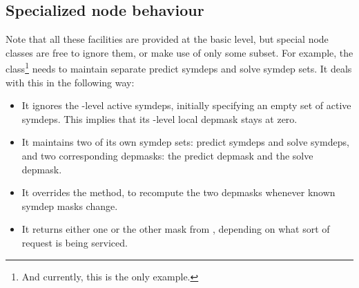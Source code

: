 \subsection{Specialized node behaviour}  
  
  Note that all these facilities are provided at the basic  level, but
  special node classes are free to ignore them, or make use of only some
  subset. For example, the  class\footnote{And currently, this is the
  only example.} needs to maintain separate predict symdeps and solve symdep
  sets. It deals with this in the following way:

  \begin{itemize}
  
  \item It ignores the -level active symdeps, initially specifying an
    empty set of active symdeps. This implies that its -level local
    depmask stays at zero.

  \item It maintains two of its own symdep sets: predict symdeps and solve
    symdeps, and two corresponding depmasks: the predict depmask and the solve
    depmask.
    
  \item It overrides the  method, to recompute the two
    depmasks whenever known symdep masks change.
    
  \item It returns either one or the other mask from , depending
    on what sort of request is being serviced.

  \end{itemize}
  
